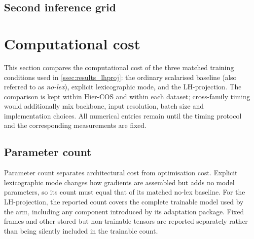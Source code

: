 \FloatBarrier


\subsection{Second inference grid}
\label{ssec:results_priority_inference_summary}


\section{Computational cost}
\label{sec:results_computational_cost}

This section compares the computational cost of the three matched training
conditions used in \cref{ssec:results_lhproj}: the ordinary scalarised baseline
(also referred to as \emph{no-lex}), explicit lexicographic mode, and the
LH-projection. The comparison is kept within Hier-COS and within each dataset;
cross-family timing would additionally mix backbone, input resolution, batch
size and implementation choices. All numerical entries remain \tbd until the
timing protocol and the corresponding measurements are fixed.

\subsection{Parameter count}
\label{ssec:results_parameter_cost}

Parameter count separates architectural cost from optimisation cost. Explicit
lexicographic mode changes how gradients are assembled but adds no model
parameters, so its count must equal that of its matched no-lex baseline. For the
LH-projection, the reported count covers the complete trainable model used by the
arm, including any component introduced by its adaptation package. Fixed frames
and other stored but non-trainable tensors are reported separately rather than
being silently included in the trainable count.

